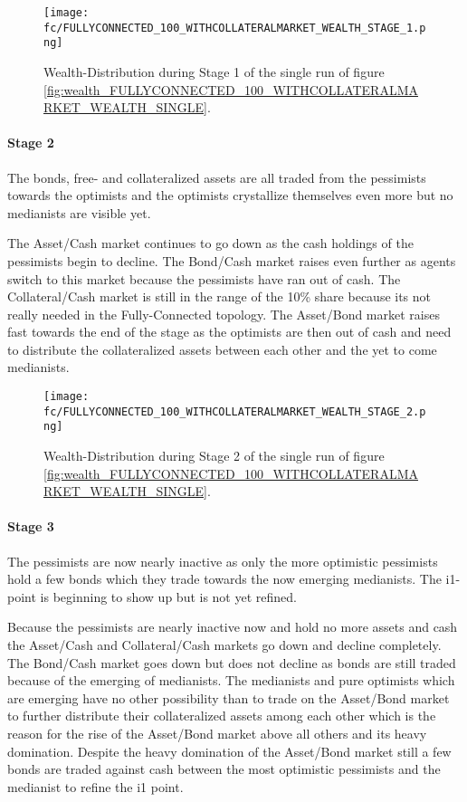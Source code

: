 \documentclass[Bachelorarbeit.tex]{subfiles}
\begin{document}
\begin{figure}[H]
	\centering
  \texttt{[image: fc/FULLYCONNECTED\_100\_WITHCOLLATERALMARKET\_WEALTH\_STAGE\_1.png]}
  	\caption{Wealth-Distribution during Stage 1 of the single run of figure \ref{fig:wealth_FULLYCONNECTED_100_WITHCOLLATERALMARKET_WEALTH_SINGLE}.}
	\label{fig:markets_FULLYCONNECTED_100_WITHCOLLATERALMARKET_WEALTH_STAGE_1}
\end{figure}

\paragraph{Stage 2}
The bonds, free- and collateralized assets are all traded from the pessimists towards the optimists and the optimists crystallize themselves even more but no medianists are visible yet.

\medskip

The Asset/Cash market continues to go down as the cash holdings of the pessimists begin to decline. The Bond/Cash market raises even further as agents switch to this market because the pessimists have ran out of cash. The Collateral/Cash market is still in the range of the 10\% share because its not really needed in the Fully-Connected topology. The Asset/Bond market raises fast towards the end of the stage as the optimists are then out of cash and need to distribute the collateralized assets between each other and the yet to come medianists.

\begin{figure}[H]
	\centering
  \texttt{[image: fc/FULLYCONNECTED\_100\_WITHCOLLATERALMARKET\_WEALTH\_STAGE\_2.png]}
  	\caption{Wealth-Distribution during Stage 2 of the single run of figure \ref{fig:wealth_FULLYCONNECTED_100_WITHCOLLATERALMARKET_WEALTH_SINGLE}.}
	\label{fig:markets_FULLYCONNECTED_100_WITHCOLLATERALMARKET_WEALTH_STAGE_2}
\end{figure}

\paragraph{Stage 3}
The pessimists are now nearly inactive as only the more optimistic pessimists hold a few bonds which they trade towards the now emerging medianists. The i1-point is beginning to show up but is not yet refined. 

\medskip

Because the pessimists are nearly inactive now and hold no more assets and cash the Asset/Cash and Collateral/Cash markets go down and decline completely. The Bond/Cash market goes down but does not decline as bonds are still traded because of the emerging of medianists. The medianists and pure optimists which are emerging have no other possibility than to trade on the Asset/Bond market to further distribute their collateralized assets among each other which is the reason for the rise of the Asset/Bond market above all others and its heavy domination. Despite the heavy domination of the Asset/Bond market still a few bonds are traded against cash between the most optimistic pessimists and the medianist to refine the i1 point.
\end{document}
